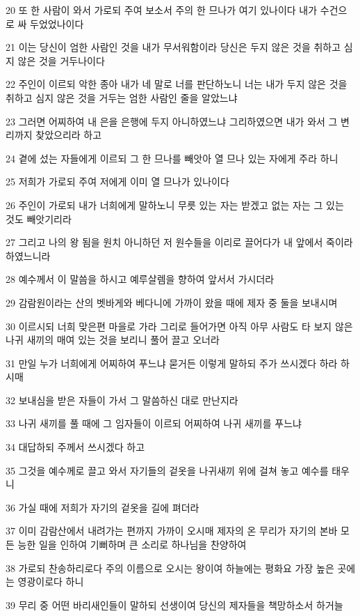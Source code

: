 \par 20 또 한 사람이 와서 가로되 주여 보소서 주의 한 므나가 여기 있나이다 내가 수건으로 싸 두었었나이다
\par 21 이는 당신이 엄한 사람인 것을 내가 무서워함이라 당신은 두지 않은 것을 취하고 심지 않은 것을 거두나이다
\par 22 주인이 이르되 악한 종아 내가 네 말로 너를 판단하노니 너는 내가 두지 않은 것을 취하고 심지 않은 것을 거두는 엄한 사람인 줄을 알았느냐
\par 23 그러면 어찌하여 내 은을 은행에 두지 아니하였느냐 그리하였으면 내가 와서 그 변리까지 찾았으리라 하고
\par 24 곁에 섰는 자들에게 이르되 그 한 므나를 빼앗아 열 므나 있는 자에게 주라 하니
\par 25 저희가 가로되 주여 저에게 이미 열 므나가 있나이다
\par 26 주인이 가로되 내가 너희에게 말하노니 무릇 있는 자는 받겠고 없는 자는 그 있는 것도 빼앗기리라
\par 27 그리고 나의 왕 됨을 원치 아니하던 저 원수들을 이리로 끌어다가 내 앞에서 죽이라 하였느니라
\par 28 예수께서 이 말씀을 하시고 예루살렘을 향하여 앞서서 가시더라
\par 29 감람원이라는 산의 벳바게와 베다니에 가까이 왔을 때에 제자 중 둘을 보내시며
\par 30 이르시되 너희 맞은편 마을로 가라 그리로 들어가면 아직 아무 사람도 타 보지 않은 나귀 새끼의 매여 있는 것을 보리니 풀어 끌고 오너라
\par 31 만일 누가 너희에게 어찌하여 푸느냐 묻거든 이렇게 말하되 주가 쓰시겠다 하라 하시매
\par 32 보내심을 받은 자들이 가서 그 말씀하신 대로 만난지라
\par 33 나귀 새끼를 풀 때에 그 임자들이 이르되 어찌하여 나귀 새끼를 푸느냐
\par 34 대답하되 주께서 쓰시겠다 하고
\par 35 그것을 예수께로 끌고 와서 자기들의 겉옷을 나귀새끼 위에 걸쳐 놓고 예수를 태우니
\par 36 가실 때에 저희가 자기의 겉옷을 길에 펴더라
\par 37 이미 감람산에서 내려가는 편까지 가까이 오시매 제자의 온 무리가 자기의 본바 모든 능한 일을 인하여 기뻐하며 큰 소리로 하나님을 찬양하여
\par 38 가로되 찬송하리로다 주의 이름으로 오시는 왕이여 하늘에는 평화요 가장 높은 곳에는 영광이로다 하니
\par 39 무리 중 어떤 바리새인들이 말하되 선생이여 당신의 제자들을 책망하소서 하거늘
